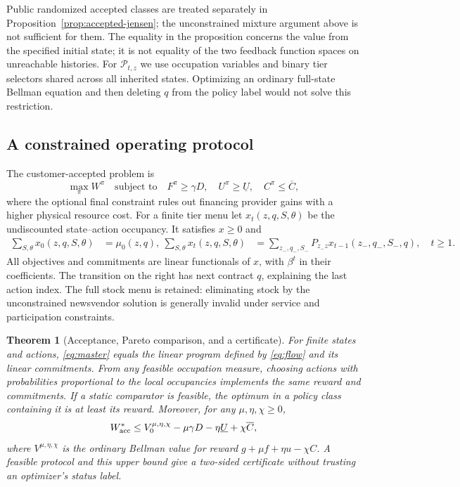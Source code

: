 \documentclass[11pt,letterpaper]{article}
\newtheorem{theorem}{Theorem}[section]
\theoremstyle{definition}
\newcommand{\1}{\mathbf 1}
\begin{document}
Public randomized accepted classes are treated separately in Proposition~\ref{prop:accepted-jensen}; the unconstrained mixture argument above is not sufficient for them. The equality in the proposition concerns the value from the specified initial state; it is not equality of the two feedback function spaces on unreachable histories. For $\mathcal P_{t,z}$ we use occupation variables and binary tier selectors shared across all inherited states. Optimizing an ordinary full-state Bellman equation and then deleting $q$ from the policy label would not solve this restriction.

\subsection{A constrained operating protocol}
The customer-accepted problem is
\begin{equation}\label{eq:master}
 \max_\pi W^\pi\quad\text{subject to}\quad
 F^\pi\geq\gamma D,\quad U^\pi\geq\underline U,
 \quad C^\pi\leq\overline C,
\end{equation}
where the optional final constraint rules out financing provider gains with a higher physical resource cost. For a finite tier menu let $x_t(z,q,S,\theta)$ be the undiscounted state--action occupancy. It satisfies $x\geq0$ and
\begin{align}
 \sum_{S,\theta}x_0(z,q,S,\theta)&=\mu_0(z,q),\
 \sum_{S,\theta}x_t(z,q,S,\theta)&=
 \sum_{z_-,q_-,S_-}P_{z_-z}x_{t-1}(z_-,q_-,S_-,q),\quad t\geq1.\label{eq:flow}
\end{align}
All objectives and commitments are linear functionals of $x$, with $\beta^t$ in their coefficients. The transition on the right has next contract $q$, explaining the last action index. The full stock menu is retained: eliminating stock by the unconstrained newsvendor solution is generally invalid under service and participation constraints.
\begin{theorem}[Acceptance, Pareto comparison, and a certificate]\label{thm:accepted}
For finite states and actions, \eqref{eq:master} equals the linear program defined by \eqref{eq:flow} and its linear commitments. From any feasible occupation measure, choosing actions with probabilities proportional to the local occupancies implements the same reward and commitments. If a static comparator is feasible, the optimum in a policy class containing it is at least its reward. Moreover, for any $\mu,\eta,\chi\geq0$,
\begin{equation}\label{eq:dual}
 W^*_{\rm acc}\leq V^{\mu,\eta,\chi}_0
           -\mu\gamma D-\eta\underline U+\chi\overline C,
\end{equation}
where $V^{\mu,\eta,\chi}$ is the ordinary Bellman value for reward
$g+\mu f+\eta u-\chi C$. A feasible protocol and this upper bound give a two-sided certificate without trusting an optimizer's status label.
\end{theorem}
\end{document}
